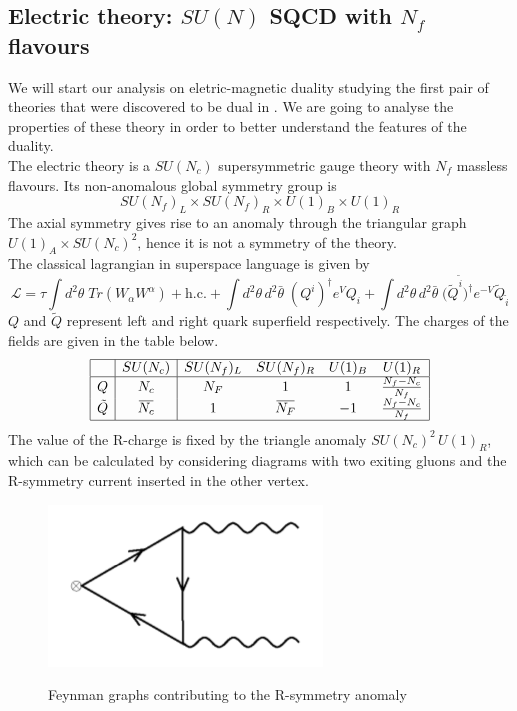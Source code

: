\subsection{Electric theory: $SU(N)$ SQCD with $N_f$ flavours }
We will start our analysis on eletric-magnetic duality studying the first pair of theories that were discovered to be dual in \cite{Seiberg:1994pq}.  
We are going to analyse the properties of these theory in order to better understand the features of the duality.
\\
The electric theory is a $SU(N_c) $ supersymmetric gauge theory with $N_f$ massless flavours.
Its non-anomalous global symmetry group is 
\begin{equation}
SU(N_f)_L \times SU(N_f)_R \times U(1)_B \times U(1)_R 
\label{eqn:seib_dual_global_symm_group}
\end{equation}
The axial symmetry gives rise to an anomaly through the triangular graph $U(1)_A  \times SU(N_c)^2$, hence it is not a symmetry of the theory.\\ 
The classical lagrangian in superspace language is given by
\begin{equation}
 \mathcal{L} = \tau \int d^2 \theta \; Tr ( W_{\alpha} W^{\alpha} ) + \mathrm{h.c.} + 
 \int d^2 \theta \, d^2 \bar{\theta} \;  ({Q}^{i})^{\dagger} e^{ V} Q_i +
 \int d^2 \theta \, d^2 \bar{\theta} \; ({\tilde{Q}^{\tilde{i}})^{ \dagger}} e^{- V} \tilde{Q}_{\tilde{i}}
 \end{equation} 
$Q$ and $\tilde{Q}$ represent left and right quark superfield respectively.
The charges of the fields are given in the table below.
\begin{equation}
 \begin{array}{| c | c |  c c c c |}
 \hline
 & SU(N_c) & SU(N_f)_L  &SU(N_f)_R   & U(1)_B &  U(1)_R \\
\hline
Q & N_c & N_F & 1   &  1  &  \frac{N_f - N_c}{N_f}  \\
\tilde{Q} &\overbar{N_c}  &  1 & \overbar{ N_F}   & -1   &  \frac{N_f - N_c}{N_f}   \\	 
\hline
 \end{array} 
 \label{tab:suN_elect_charge}
\end{equation}
The value of the R-charge is fixed by the triangle anomaly $SU(N_c)^2 \, U(1)_R $, which can be calculated by considering diagrams with two exiting gluons and the R-symmetry current inserted in the other vertex.
\begin{figure}
\centering
\includegraphics[scale=0.6]{r-symm_anomlay.png}
\label{fig:r_symm_triangle_anom}
\caption{Feynman graphs contributing to the R-symmetry anomaly}
\end{figure}
